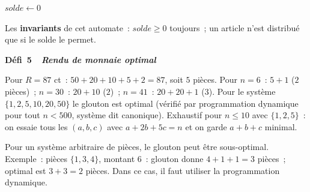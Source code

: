 \begin{algorithm}[H]
\caption{Automate distributeur}
$\mathit{solde} \leftarrow 0$\;
\end{algorithm}

Les \textbf{invariants} de cet automate~:
$\mathit{solde}\geq0$ toujours~;
un article n'est distribu\'e que si le solde le permet.

\noindent{}
{\color{BO}\bfseries\small D\'efi~5~\textendash\ \textit{Rendu de monnaie optimal}}
\par\smallskip

\begin{algorithm}[H]
\caption{Rendu de monnaie glouton}
\end{algorithm}

Pour $R=87$ ct~: $50+20+10+5+2=87$, soit $5$ pi\`eces. Pour $n=6$~: $5+1$ ($2$ pi\`eces)~; $n=30$~: $20+10$ ($2$)~; $n=41$~: $20+20+1$ ($3$).
Pour le syst\`eme $\{1,2,5,10,20,50\}$ le glouton est optimal (v\'erifi\'e par programmation dynamique pour tout $n<500$, syst\`eme dit \og canonique\fg).
Exhaustif pour $n\le10$ avec $\{1,2,5\}$~: on essaie tous les $(a,b,c)$ avec $a+2b+5c=n$ et on garde $a+b+c$ minimal.

Pour un syst\`eme arbitraire de pi\`eces, le glouton peut \^etre sous-optimal.
Exemple~: pi\`eces $\{1,3,4\}$, montant $6$~:
glouton donne $4+1+1=3$ pi\`eces~; optimal est $3+3=2$ pi\`eces.
Dans ce cas, il faut utiliser la programmation dynamique.


